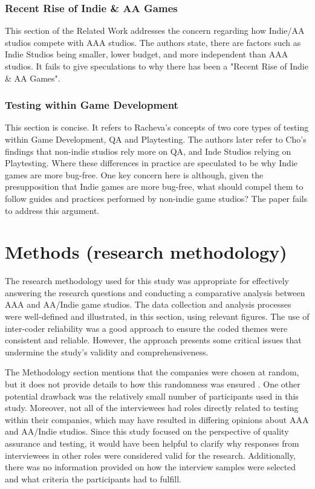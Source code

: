 \documentclass[conference]{IEEEtran}
\begin{document}
\subsubsection{Recent Rise of Indie \& AA Games} This section of the Related Work addresses the concern regarding how Indie/AA studios compete with AAA studios. The authors state, there are factors such as Indie Studios being smaller, lower budget, and more independent than AAA studios. It fails to give speculations to why there has been a "Recent Rise of Indie \& AA Games".\\
\subsubsection{Testing within Game Development} This section is concise. It refers to Racheva's concepts of two core types of testing within Game Development, QA and Playtesting.  
The authors later refer to Cho's findings that non-indie studios rely more on QA, and Inde Studios relying on Playtesting. Where these differences in practice are speculated to be why Indie games are more bug-free.
One key concern here is although, given the presupposition that Indie games are more bug-free, what should compel them to follow guides and practices performed by non-indie game studios? The paper fails to address this argument.






\section{Methods (research methodology)}
The research methodology used for this study was appropriate for effectively answering the research questions and conducting a comparative analysis between AAA and AA/Indie game studios. The data collection and analysis processes were well-defined and illustrated, in this section, using relevant figures. The use of inter-coder reliability was a good approach to ensure the coded themes were consistent and reliable. However, the approach presents some critical issues that undermine the study's validity and comprehensiveness.

The Methodology section mentions that the companies were chosen at random, but it does not provide details to how this randomness was ensured . One other potential drawback was the relatively small number of participants used in this study. Moreover, not all of the interviewees had roles directly related to testing within their companies, which may have resulted in differing opinions about AAA and AA/Indie studios. Since this study focused on the perspective of quality assurance and testing, it would have been helpful to clarify why responses from interviewees in other roles were considered valid for the research. Additionally, there was no information provided on how the interview samples were selected and what criteria the participants had to fulfill.
\end{document}
